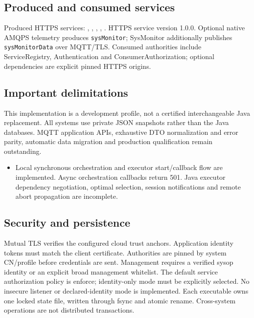 \documentclass[a4paper]{arrowhead}
\begin{document}
\subsection{Produced and consumed services}
Produced HTTPS services: , \allowbreak {}, \allowbreak {}, \allowbreak {}, \allowbreak {}.
HTTPS service version 1.0.0. Optional native AMQPS telemetry produces \texttt{sysMonitor}; SysMonitor additionally publishes \texttt{sysMonitorData} over MQTT/TLS. Consumed authorities include ServiceRegistry, Authentication and ConsumerAuthorization; optional dependencies are explicit pinned HTTPS origins.
\subsection{Important delimitations}
This implementation is a development profile, not a certified interchangeable Java replacement. All systems use private JSON snapshots rather than the Java databases. MQTT application APIs, exhaustive DTO normalization and error parity, automatic data migration and production qualification remain outstanding.
\begin{itemize}
\item Local synchronous orchestration and executor start/callback flow are implemented. Async orchestration callbacks return 501. Java executor dependency negotiation, optimal selection, session notifications and remote abort propagation are incomplete.
\end{itemize}
\subsection{Security and persistence}
Mutual TLS verifies the configured cloud trust anchors. Application identity tokens must match the client certificate. Authorities are pinned by system CN/profile before credentials are sent. Management requires a verified sysop identity or an explicit broad management whitelist. The default service authorization policy is enforce; identity-only mode must be explicitly selected. No insecure listener or declared-identity mode is implemented. Each executable owns one locked state file, written through fsync and atomic rename. Cross-system operations are not distributed transactions.
\clearpage
\end{document}

